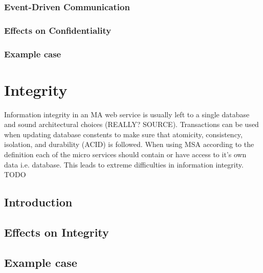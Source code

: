 \subsubsection{Event-Driven Communication}
\begin{sloppypar}
    
\end{sloppypar}




\subsubsection{Effects on Confidentiality}
\begin{sloppypar}
    
\end{sloppypar}




\subsubsection{Example case}
\begin{sloppypar}
    
\end{sloppypar}




\section{Integrity}
\begin{sloppypar}
    Information integrity in an MA web service is usually left to a single database 
    and sound architectural choices (REALLY? SOURCE).
    Transactions can be used when updating database constents to make sure that
    atomicity, consistency, isolation, and durability (ACID) \citep{acid} is followed.
    When using MSA according to the definition each of the micro services should contain 
    or have access to it's own data i.e. database. This leads to extreme difficulties in information integrity.
    TODO
\end{sloppypar}


\subsection{Introduction}
\subsection{Effects on Integrity}
\subsection{Example case}




